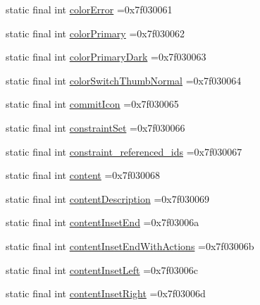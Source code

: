 \begin{DoxyCompactItemize}
\item 
static final int \mbox{\hyperlink{classcom_1_1example_1_1trainawearapplication_1_1_r_1_1attr_a3ffb6df2ae2792737e5462515f5e38c3}{color\+Error}} =0x7f030061
\item 
static final int \mbox{\hyperlink{classcom_1_1example_1_1trainawearapplication_1_1_r_1_1attr_aceb4510a798e191d62a6591ff5da036c}{color\+Primary}} =0x7f030062
\item 
static final int \mbox{\hyperlink{classcom_1_1example_1_1trainawearapplication_1_1_r_1_1attr_a7de60c9bd46c92b929b58e2852d4603e}{color\+Primary\+Dark}} =0x7f030063
\item 
static final int \mbox{\hyperlink{classcom_1_1example_1_1trainawearapplication_1_1_r_1_1attr_a93b9e034a906b5b3ca3a59c9ae884ad3}{color\+Switch\+Thumb\+Normal}} =0x7f030064
\item 
static final int \mbox{\hyperlink{classcom_1_1example_1_1trainawearapplication_1_1_r_1_1attr_a0fbe386f8202a96e1f4703d3fc825361}{commit\+Icon}} =0x7f030065
\item 
static final int \mbox{\hyperlink{classcom_1_1example_1_1trainawearapplication_1_1_r_1_1attr_a67710bbbc6a220c9a4f231a16c5f9bff}{constraint\+Set}} =0x7f030066
\item 
static final int \mbox{\hyperlink{classcom_1_1example_1_1trainawearapplication_1_1_r_1_1attr_a5600edd641561c1abbba03843a211875}{constraint\+\_\+referenced\+\_\+ids}} =0x7f030067
\item 
static final int \mbox{\hyperlink{classcom_1_1example_1_1trainawearapplication_1_1_r_1_1attr_adcfb37c3b909c528ea065338c60dc8d7}{content}} =0x7f030068
\item 
static final int \mbox{\hyperlink{classcom_1_1example_1_1trainawearapplication_1_1_r_1_1attr_ac8f7f9714d668bc772f16109768289bc}{content\+Description}} =0x7f030069
\item 
static final int \mbox{\hyperlink{classcom_1_1example_1_1trainawearapplication_1_1_r_1_1attr_a06d18dbc6c7a98246499e7539f24dafd}{content\+Inset\+End}} =0x7f03006a
\item 
static final int \mbox{\hyperlink{classcom_1_1example_1_1trainawearapplication_1_1_r_1_1attr_a501e43a23a32d08c31a83d94271eeaf7}{content\+Inset\+End\+With\+Actions}} =0x7f03006b
\item 
static final int \mbox{\hyperlink{classcom_1_1example_1_1trainawearapplication_1_1_r_1_1attr_a61ecc5033e7caec3323cad185e4f29b5}{content\+Inset\+Left}} =0x7f03006c
\item 
static final int \mbox{\hyperlink{classcom_1_1example_1_1trainawearapplication_1_1_r_1_1attr_ae213c991ec0103e3b966e3363f737584}{content\+Inset\+Right}} =0x7f03006d

\end{DoxyCompactItemize}
